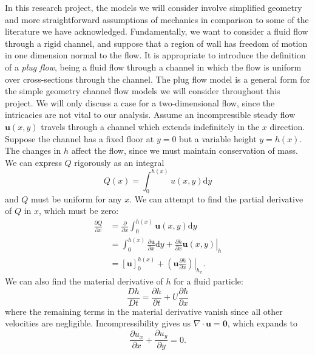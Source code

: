 \documentclass{report}
\begin{document}
In this research project, the models we will consider involve simplified geometry and more straightforward assumptions of mechanics in comparison to some of the literature we have acknowledged.
Fundamentally, we want to consider a fluid flow through a rigid channel, and suppose that a region of wall has freedom of motion in one dimension normal to the flow.
It is appropriate to introduce the definition of a \textit{plug flow}, being a fluid flow through a channel in which the flow is uniform over cross-sections through the channel.
The plug flow model is a general form for the simple geometry channel flow models we will consider throughout this project.
We will only discuss a case for a two-dimensional flow, since the intricacies are not vital to our analysis.
Assume an incompressible steady flow \(\mathbf{u}(x,y)\) travels through a channel which extends indefinitely in the $x$ direction.
Suppose the channel has a fixed floor at $y=0$ but a variable height $y=h(x)$.
The changes in $h$ affect the flow, since we must maintain conservation of mass.
We can express $Q$ rigorously as an integral
\begin{equation*}
    Q(x) = \int_{0}^{h(x)}u(x,y) \mathrm{d}y
\end{equation*}
and $Q$ must be uniform for any $x$.
We can attempt to find the partial derivative of $Q$ in $x$, which must be zero:
\begin{align*}
    \frac{\partial Q}{\partial x} &= \frac{\partial}{\partial x} \int_{0}^{h(x)}\mathbf{u}(x,y)\mathrm{d}y \\
    &= \int_{0}^{h(x)}\frac{\partial \mathbf{u}}{\partial x}\mathrm{d}y + \left.\frac{\partial h}{\partial x}\mathbf{u}(x,y)\right|_h \tag{by Product Rule,} \\
    &= \left[ \mathbf{u} \right]_0^{h(x)} + \left.
        \left( \mathbf{u}\frac{\partial h}{\partial x} \right)
    \right|_{h_x}.
\end{align*}
We can also find the material derivative of $h$ for a fluid particle:
\begin{equation*}
    \frac{Dh}{Dt} = \frac{\partial h}{\partial t} + U \frac{\partial h}{\partial x}
\end{equation*}
where the remaining terms in the material derivative vanish since all other velocities are negligible.
Incompressibility gives us \(\nabla \cdot \mathbf{u} = \mathbf{0}\), which expands to
\begin{equation*}
    \frac{\partial u_x}{\partial x} + \frac{\partial u_y}{\partial y} = 0.
\end{equation*}
\end{document}
